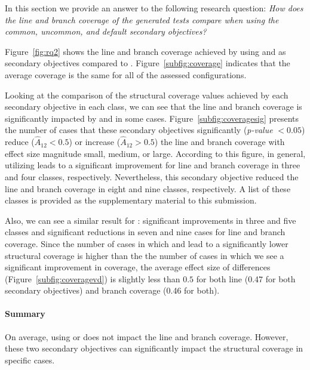In this section we provide an answer to the following research question: \emph{How does the \emph{line} and \emph{branch coverage} of the generated tests  compare when using the \textit{common}, \textit{uncommon}, and \textit{default} secondary objectives?}

Figure~\ref{fig:rq2} shows the line and branch coverage achieved by using \com and \ucom as secondary objectives compared to \df. Figure~\ref{subfig:coverage} indicates that the average coverage is the same for all of the assessed configurations.

Looking at the comparison of the structural coverage values achieved by each secondary objective in each class, we can see that the line and branch coverage is significantly impacted by \com and \ucom in some cases. Figure~\ref{subfig:coveragesig} presents the number of cases that these secondary objectives significantly (\textit{p-value} $<0.05$) reduce ($\widehat{A}_{12} < 0.5$) or increase ($\widehat{A}_{12} > 0.5$) the line and branch coverage with effect size magnitude small, medium, or large. According to this figure, in general, utilizing \com leads to a significant improvement for line and branch coverage in three and four classes, respectively. Nevertheless, this secondary objective reduced the line and branch coverage in eight and nine classes, respectively. 
A list of these classes is provided as the supplementary material to this submission.

Also, we can see a similar result for \ucom:
significant improvements in three and five classes and significant reductions in seven and nine cases for line and branch coverage. Since the number of cases in which \com and \ucom lead to a significantly lower structural coverage is higher than the the number of cases in which we see a significant improvement in coverage, the average effect size of differences (Figure~\ref{subfig:coveragevd}) is slightly less than  $0.5$ for both line (0.47 for both secondary objectives) and branch coverage (0.46 for both).

\paragraph{Summary} On average, using \com or \ucom does not impact the line and branch coverage. However, these two secondary objectives can significantly impact the structural coverage in specific cases.

